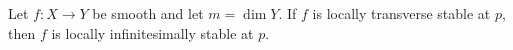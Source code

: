 Let $f: X \to Y$ be smooth and let $m = \dim Y$. If $f$ is locally transverse stable at $p$, then $f$ is locally infinitesimally stable at $p$.
